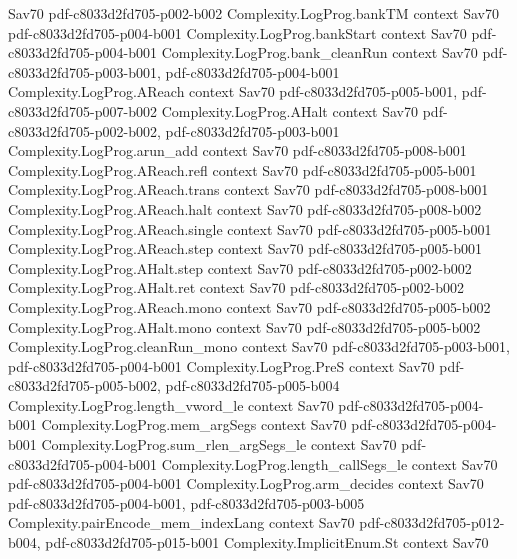 \begin{theorem}
  {Sav70}
  {pdf-c8033d2fd705-p002-b002}
\proofstep
  {Complexity.LogProg.bankTM}
  {context}
  {Sav70}
  {pdf-c8033d2fd705-p004-b001}
\proofstep
  {Complexity.LogProg.bankStart}
  {context}
  {Sav70}
  {pdf-c8033d2fd705-p004-b001}
\proofstep
  {Complexity.LogProg.bank_cleanRun}
  {context}
  {Sav70}
  {pdf-c8033d2fd705-p003-b001,
    pdf-c8033d2fd705-p004-b001}
\proofstep
  {Complexity.LogProg.AReach}
  {context}
  {Sav70}
  {pdf-c8033d2fd705-p005-b001,
    pdf-c8033d2fd705-p007-b002}
\proofstep
  {Complexity.LogProg.AHalt}
  {context}
  {Sav70}
  {pdf-c8033d2fd705-p002-b002,
    pdf-c8033d2fd705-p003-b001}
\proofstep
  {Complexity.LogProg.arun_add}
  {context}
  {Sav70}
  {pdf-c8033d2fd705-p008-b001}
\proofstep
  {Complexity.LogProg.AReach.refl}
  {context}
  {Sav70}
  {pdf-c8033d2fd705-p005-b001}
\proofstep
  {Complexity.LogProg.AReach.trans}
  {context}
  {Sav70}
  {pdf-c8033d2fd705-p008-b001}
\proofstep
  {Complexity.LogProg.AReach.halt}
  {context}
  {Sav70}
  {pdf-c8033d2fd705-p008-b002}
\proofstep
  {Complexity.LogProg.AReach.single}
  {context}
  {Sav70}
  {pdf-c8033d2fd705-p005-b001}
\proofstep
  {Complexity.LogProg.AReach.step}
  {context}
  {Sav70}
  {pdf-c8033d2fd705-p005-b001}
\proofstep
  {Complexity.LogProg.AHalt.step}
  {context}
  {Sav70}
  {pdf-c8033d2fd705-p002-b002}
\proofstep
  {Complexity.LogProg.AHalt.ret}
  {context}
  {Sav70}
  {pdf-c8033d2fd705-p002-b002}
\proofstep
  {Complexity.LogProg.AReach.mono}
  {context}
  {Sav70}
  {pdf-c8033d2fd705-p005-b002}
\proofstep
  {Complexity.LogProg.AHalt.mono}
  {context}
  {Sav70}
  {pdf-c8033d2fd705-p005-b002}
\proofstep
  {Complexity.LogProg.cleanRun_mono}
  {context}
  {Sav70}
  {pdf-c8033d2fd705-p003-b001,
    pdf-c8033d2fd705-p004-b001}
\proofstep
  {Complexity.LogProg.PreS}
  {context}
  {Sav70}
  {pdf-c8033d2fd705-p005-b002,
    pdf-c8033d2fd705-p005-b004}
\proofstep
  {Complexity.LogProg.length_vword_le}
  {context}
  {Sav70}
  {pdf-c8033d2fd705-p004-b001}
\proofstep
  {Complexity.LogProg.mem_argSegs}
  {context}
  {Sav70}
  {pdf-c8033d2fd705-p004-b001}
\proofstep
  {Complexity.LogProg.sum_rlen_argSegs_le}
  {context}
  {Sav70}
  {pdf-c8033d2fd705-p004-b001}
\proofstep
  {Complexity.LogProg.length_callSegs_le}
  {context}
  {Sav70}
  {pdf-c8033d2fd705-p004-b001}
\proofstep
  {Complexity.LogProg.arm_decides}
  {context}
  {Sav70}
  {pdf-c8033d2fd705-p004-b001,
    pdf-c8033d2fd705-p003-b005}
\proofstep
  {Complexity.pairEncode_mem_indexLang}
  {context}
  {Sav70}
  {pdf-c8033d2fd705-p012-b004,
    pdf-c8033d2fd705-p015-b001}
\proofstep
  {Complexity.ImplicitEnum.St}
  {context}
  {Sav70}

\end{theorem}

